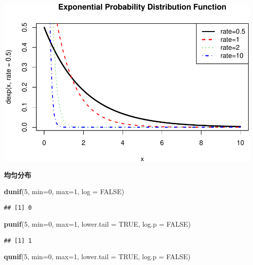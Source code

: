 \documentclass[]{article}
\newenvironment{Shaded}{\begin{snugshade}}{\end{snugshade}}
\newcommand{\KeywordTok}[1]{\textcolor[rgb]{0.13,0.29,0.53}{\textbf{{#1}}}}
\newcommand{\DataTypeTok}[1]{\textcolor[rgb]{0.13,0.29,0.53}{{#1}}}
\newcommand{\DecValTok}[1]{\textcolor[rgb]{0.00,0.00,0.81}{{#1}}}
\newcommand{\OtherTok}[1]{\textcolor[rgb]{0.56,0.35,0.01}{{#1}}}
\newcommand{\NormalTok}[1]{{#1}}
\begin{document}
\includegraphics{probability_files/figure-latex/unnamed-chunk-21-2.pdf}

\textbf{均匀分布}

\begin{Shaded}
\begin{Highlighting}[]
\KeywordTok{dunif}\NormalTok{(}\DecValTok{5}\NormalTok{, }\DataTypeTok{min=}\DecValTok{0}\NormalTok{, }\DataTypeTok{max=}\DecValTok{1}\NormalTok{, }\DataTypeTok{log =} \OtherTok{FALSE}\NormalTok{)}
\end{Highlighting}
\end{Shaded}

\begin{verbatim}
## [1] 0
\end{verbatim}

\begin{Shaded}
\begin{Highlighting}[]
\KeywordTok{punif}\NormalTok{(}\DecValTok{5}\NormalTok{, }\DataTypeTok{min=}\DecValTok{0}\NormalTok{, }\DataTypeTok{max=}\DecValTok{1}\NormalTok{, }\DataTypeTok{lower.tail =} \OtherTok{TRUE}\NormalTok{, }\DataTypeTok{log.p =} \OtherTok{FALSE}\NormalTok{)}
\end{Highlighting}
\end{Shaded}

\begin{verbatim}
## [1] 1
\end{verbatim}

\begin{Shaded}
\begin{Highlighting}[]
\KeywordTok{qunif}\NormalTok{(}\DecValTok{5}\NormalTok{, }\DataTypeTok{min=}\DecValTok{0}\NormalTok{, }\DataTypeTok{max=}\DecValTok{1}\NormalTok{, }\DataTypeTok{lower.tail =} \OtherTok{TRUE}\NormalTok{, }\DataTypeTok{log.p =} \OtherTok{FALSE}\NormalTok{)}
\end{Highlighting}
\end{Shaded}
\end{document}
